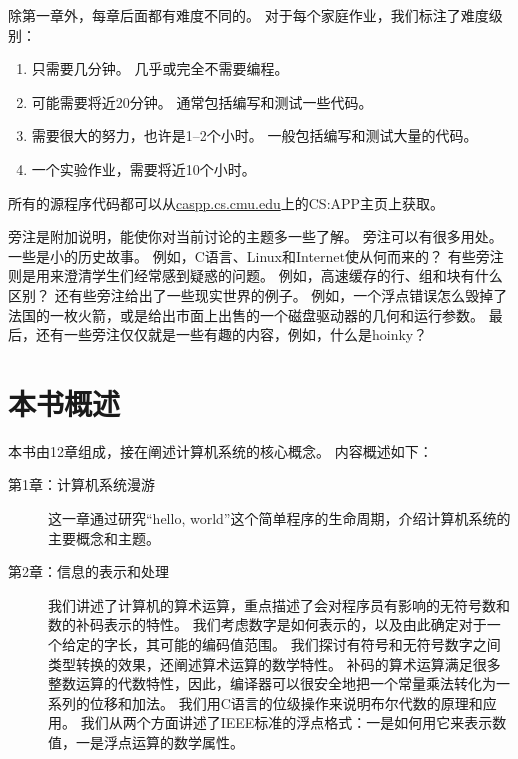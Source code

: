 {{        除第一章外，每章后面都有难度不同的。
        对于每个家庭作业，我们标注了难度级别：

        \begin{enumerate}
            \item
            {
                只需要几分钟。
                几乎或完全不需要编程。
            }
            \item
            {
                可能需要将近20分钟。
                通常包括编写和测试一些代码。
            }
            \item
            {
                需要很大的努力，也许是1--2个小时。
                一般包括编写和测试大量的代码。
            }
            \item 一个实验作业，需要将近10个小时。
        \end{enumerate}

        所有的源程序代码都可以从\url{caspp.cs.cmu.edu}上的CS:APP主页上获取。

        {
            旁注是附加说明，能使你对当前讨论的主题多一些了解。
            旁注可以有很多用处。
            一些是小的历史故事。
            例如，C语言、Linux和Internet使从何而来的？
            有些旁注则是用来澄清学生们经常感到疑惑的问题。
            例如，高速缓存的行、组和块有什么区别？
            还有些旁注给出了一些现实世界的例子。
            例如，一个浮点错误怎么毁掉了法国的一枚火箭，或是给出市面上出售的一个磁盘驱动器的几何和运行参数。
            最后，还有一些旁注仅仅就是一些有趣的内容，例如，什么是hoinky？
        }
    }

    \section{本书概述}
    {
        本书由12章组成，接在阐述计算机系统的核心概念。
        内容概述如下：

        \begin{description}
            \item[第1章：计算机系统漫游] 这一章通过研究``hello, world''这个简单程序的生命周期，介绍计算机系统的主要概念和主题。
            \item[第2章：信息的表示和处理]
            {
                我们讲述了计算机的算术运算，重点描述了会对程序员有影响的无符号数和数的补码表示的特性。
                我们考虑数字是如何表示的，以及由此确定对于一个给定的字长，其可能的编码值范围。
                我们探讨有符号和无符号数字之间类型转换的效果，还阐述算术运算的数学特性。
                补码的算术运算满足很多整数运算的代数特性，因此，编译器可以很安全地把一个常量乘法转化为一系列的位移和加法。
                我们用C语言的位级操作来说明布尔代数的原理和应用。
                我们从两个方面讲述了IEEE标准的浮点格式：一是如何用它来表示数值，一是浮点运算的数学属性。

}
\end{description}}}
